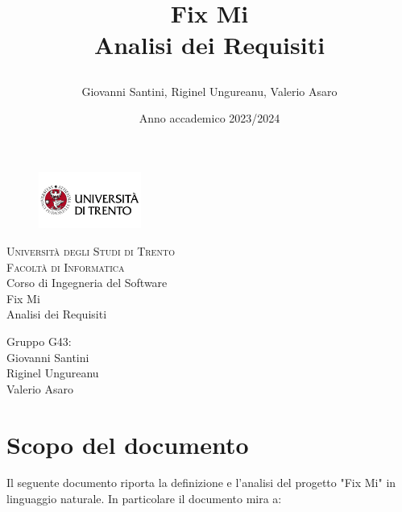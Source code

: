 \documentclass{report}
\title{

	Fix Mi \\
	Analisi dei Requisiti
}
\author{Giovanni Santini, Riginel Ungureanu, Valerio Asaro}
\date{Anno accademico 2023/2024}
\begin{document}
\begin{titlepage}
	\begin{figure}[t]
		\centering\includegraphics[width=0.3\textwidth]{images/unitn-logo}
	\end{figure}
	\begin{center}
		\textsc{ \LARGE{Università degli Studi di Trento \\}}
		\textsc{ \LARGE{Facoltà di Informatica\\ }}
		\textnormal{ \LARGE{Corso di Ingegneria del Software\\}}
		\vspace{30mm}
		\fontsize{10mm}{7mm}\selectfont 
		\textup{Fix Mi \\ Analisi dei Requisiti}\\
	\end{center}
	
	\vspace{25mm}
	
	\centering
	\large Gruppo G43:\\ Giovanni Santini \\ Riginel Ungureanu \\ Valerio Asaro
	
	\vspace{20mm}
	
	
\end{titlepage}


\pagestyle{fancy}
\fancyhead[R]{\chaptername\ \thechapter}  %

\tableofcontents
\newpage





\section{Scopo del documento}
Il seguente documento riporta la definizione e l'analisi del progetto "Fix Mi" in linguaggio naturale.
In particolare il documento mira a:
\end{document}
